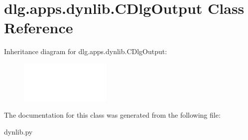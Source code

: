 \hypertarget{classdlg_1_1apps_1_1dynlib_1_1_c_dlg_output}{}\section{dlg.\+apps.\+dynlib.\+C\+Dlg\+Output Class Reference}
\label{classdlg_1_1apps_1_1dynlib_1_1_c_dlg_output}
Inheritance diagram for dlg.\+apps.\+dynlib.\+C\+Dlg\+Output\+:\begin{figure}[H]
\begin{center}
\leavevmode
\includegraphics[height=2.000000cm]{classdlg_1_1apps_1_1dynlib_1_1_c_dlg_output}
\end{center}
\end{figure}


The documentation for this class was generated from the following file\+:\begin{DoxyCompactItemize}
\item 
dynlib.\+py\end{DoxyCompactItemize}
